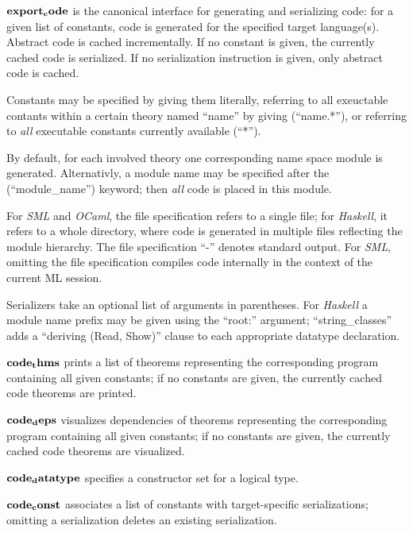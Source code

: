 \begin{descr}

\item [${\mathord{\mathbf{export_code}}}$] is the canonical interface for generating and
  serializing code: for a given list of constants, code is generated for the specified
  target language(s).  Abstract code is cached incrementally.  If no constant is given,
  the currently cached code is serialized.  If no serialization instruction
  is given, only abstract code is cached.

  Constants may be specified by giving them literally, referring
  to all exeuctable contants within a certain theory named ``name''
  by giving (``name.*''), or referring to \emph{all} executable
  constants currently available (``*'').

  By default, for each involved theory one corresponding name space module
  is generated.  Alternativly, a module name may be specified after the
  (``module_name'') keyword; then \emph{all} code is placed in this module.

  For \emph{SML} and \emph{OCaml}, the file specification refers to
  a single file;  for \emph{Haskell}, it refers to a whole directory,
  where code is generated in multiple files reflecting the module hierarchy.
  The file specification ``-'' denotes standard output.  For \emph{SML},
  omitting the file specification compiles code internally
  in the context of the current ML session.

  Serializers take an optional list of arguments in parentheses. 
  For \emph{Haskell} a module name prefix may be given using the ``root:''
  argument;  ``string\_classes'' adds a ``deriving (Read, Show)'' clause
  to each appropriate datatype declaration.

\item [${\mathord{\mathbf{code_thms}}}$] prints a list of theorems representing the
  corresponding program containing all given constants; if no constants are
  given, the currently cached code theorems are printed.

\item [${\mathord{\mathbf{code_deps}}}$] visualizes dependencies of theorems representing the
  corresponding program containing all given constants; if no constants are
  given, the currently cached code theorems are visualized.

\item [${\mathord{\mathbf{code_datatype}}}$] specifies a constructor set for a logical type.

\item [${\mathord{\mathbf{code_const}}}$] associates a list of constants
  with target-specific serializations; omitting a serialization
  deletes an existing serialization.


\end{descr}
